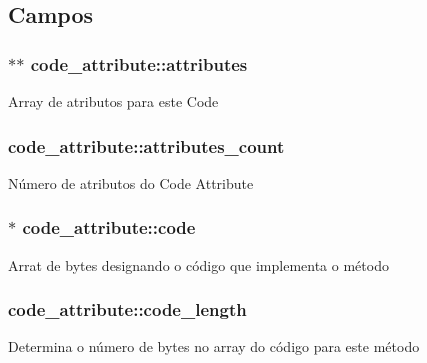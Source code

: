 \subsection{Campos}
\subsubsection[{\texorpdfstring{attributes}{attributes}}]{$\ast$$\ast$ code\+\_\+attribute\+::attributes}\hypertarget{structcode__attribute_a6e986c701d34b14f33959e35606b46ed}{}\label{structcode__attribute_a6e986c701d34b14f33959e35606b46ed}
Array de atributos para este Code 
\subsubsection[{\texorpdfstring{attributes\+\_\+count}{attributes_count}}]{ code\+\_\+attribute\+::attributes\+\_\+count}\hypertarget{structcode__attribute_a7c0a342c05fa196324b0806f6704916b}{}\label{structcode__attribute_a7c0a342c05fa196324b0806f6704916b}
Número de atributos do Code Attribute 
\subsubsection[{\texorpdfstring{code}{code}}]{$\ast$ code\+\_\+attribute\+::code}\hypertarget{structcode__attribute_a72ecf2f84184325965481ecbc8d997cd}{}\label{structcode__attribute_a72ecf2f84184325965481ecbc8d997cd}
Arrat de bytes designando o código que implementa o método 
\subsubsection[{\texorpdfstring{code\+\_\+length}{code_length}}]{ code\+\_\+attribute\+::code\+\_\+length}\hypertarget{structcode__attribute_a8c2176f2e2a92747fd2920fde5992b43}{}\label{structcode__attribute_a8c2176f2e2a92747fd2920fde5992b43}
Determina o número de bytes no array do código para este método 
